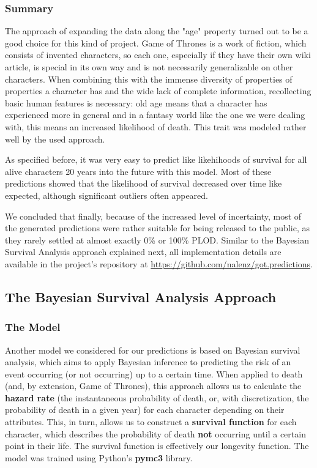 \documentclass{bioinfo}
\begin{document}
\subsubsection{Summary}

The approach of expanding the data along the "age" property turned out to be a good choice for this kind of project. Game of Thrones is a work of fiction, which consists of invented characters, so each one, especially if they have their own wiki article, is special in its own way and is not necessarily generalizable on other characters. When combining this with the immense diversity of properties of properties a character has and the wide lack of complete information, recollecting basic human features is necessary: old age means that a character has experienced more in general and in a fantasy world like the one we were dealing with, this means an increased likelihood of death. This trait was modeled rather well by the used approach.

As specified before, it was very easy to predict like likehihoods of survival for all alive characters 20 years into the future with this model. Most of these predictions showed that the likelihood of survival decreased over time like expected, although significant outliers often appeared.

We concluded that finally, because of the increased level of incertainty, most of the generated predictions were rather suitable for being released to the public, as they rarely settled at almost exactly 0\% or 100\% PLOD. Similar to the Bayesian Survival Analysis approach explained next, all implementation details are available in the project's repository at \url{https://github.com/nalenz/got.predictions}.


\subsection{The Bayesian Survival Analysis Approach}
\subsubsection{The Model}
Another model we considered for our predictions is based on Bayesian survival analysis, which aims to apply Bayesian inference to predicting the risk of an event occurring (or not occurring) up to a certain time. When applied to death (and, by extension, Game of Thrones), this approach allows us to calculate the \textbf{hazard rate} (the instantaneous probability of death, or, with discretization, the probability of death in a given year) for each character depending on their attributes. This, in turn, allows us to construct a \textbf{survival function} for each character, which describes the probability of death \textbf{not} occurring until a certain point in their life. The survival function is effectively our longevity function. The model was trained using Python's \textbf{pymc3} library. \cite{pymc3} 
\end{document}
